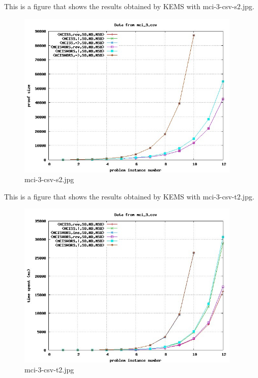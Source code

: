 This is a figure that shows the results obtained by KEMS with mci-3-csv-s2.jpg.
\begin{figure}[htbp]
\begin{center}
\includegraphics[width=0.95\textwidth]{figuras/mci-3-csv-s2.jpg}
\end{center}
\caption{mci-3-csv-s2.jpg}
\end{figure}

This is a figure that shows the results obtained by KEMS with mci-3-csv-t2.jpg.
\begin{figure}[htbp]
\begin{center}
\includegraphics[width=0.95\textwidth]{figuras/mci-3-csv-t2.jpg}
\end{center}
\caption{mci-3-csv-t2.jpg}
\end{figure}

